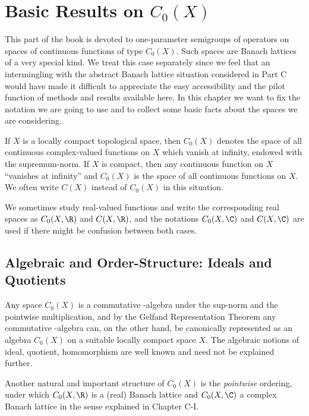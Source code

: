 
\chapter{Basic Results on $C_{0}(X)$}\label{chap:B-I}
This part of the book is devoted to one-parameter semigroups of operators on spaces of continuous functions of type $C_{0}(X)$.
Such spaces are Banach lattices of a very special kind.
We treat this case separately since we feel that an intermingling with the abstract Banach lattice situation considered in Part C would have made it difficult to appreciate the easy accessibility and the pilot function of methods and results available here.
In this chapter we want to fix the notation we are going to use and to collect some basic facts about the spaces we are considering.

If $X$ is a locally compact topological space, then $C_{0}(X)$ denotes the space of all continuous complex-valued functions on $X$ which vanish at infinity, endowed with the supremum-norm.
If $X$ is compact, then any continuous function on $X$ \enquote{vanishes at infinity} and $C_{0}(X)$ is the space of all continuous functions on $X$.
We often write $C(X)$ instead of $C_{0}(X)$ in this situation.

We sometimes study real-valued functions and write the corresponding real spaces as $C_{0}(X,\R)$ and 
$C(X,\R)$, and the notations $C_{0}(X,\C)$ and $C(X,\C)$ are used if there might be confusion between both cases.
\section{Algebraic and Order-Structure: Ideals and Quotients}\label{sec:b1-1.1}
Any space $C_{0}(X)$ is a commutative \CA-algebra under the sup-norm and the pointwise multiplication, and by the Gelfand Representation Theorem any commutative \CA-algebra can, on the other hand, be canonically represented as an algebra $C_{0}(X)$ on a suitable locally compact space $X$.
The algebraic notions of ideal, quotient, homomorphism are well known and need not be explained further.

Another natural and important structure of $C_{0}(X)$ is the \emph{pointwise} ordering, under which $C_{0}(X,\R)$ is a (real) Banach lattice and $C_{0}(X,\C)$ a complex Banach lattice in the sense explained in Chapter C-I.

